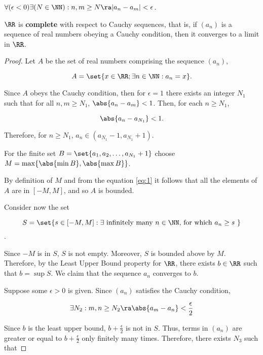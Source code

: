 \documentclass[11pt]{scrartcl}
\begin{document}
\begin{definition}
  $\forall(\epsilon<0)\exists(N\in\NN): n,m \geq N \ra |a_n-a_m|<\epsilon $.
\end{definition}
\begin{theorem}
  $\RR$ is \textbf{complete} with respect to Cauchy sequences, that
  is, if $(a_n)$ is a sequence of real numbers obeying a Cauchy
  condition, then it converges to a limit in $\RR$.
\end{theorem}

\begin{proof}
  Let \(A\) be the set of real numbers comprising the sequence \((a_{n})\),

  \[A = \set{x\in \RR; \exists n\in \NN: a_{n} = x}.   \]

  Since \(A\) obeys the Cauchy condition, then for \(\epsilon = 1\)
  there exists an integer \(N_{1}\) such that for all
  \(n,m\geq N_{1}\), \(\abs{a_{n}-a_{m}}<1\). Then, for each \(n\geq N_{1}\),
  
  \begin{equation}
    \label{eq:1}
    \abs{a_{n}-  a_{N_{1}}}<1.
  \end{equation}
 
  Therefore, for \(n\geq N_{1}\), \(a_{n}\in(a_{N_{1}}-1, a_{N_{1}}+1)\).\vv

  For the finite set \(B=\set{a_{1},a_{2},\dots,a_{N_{1}}+1}\) choose
  \(M=\max\{\abs{\min B}, \abs{\max B}\}\).\vv

  By definition of \(M\) and from the equation \ref{eq:1} it follows
  that all the elements of \(A\) are in \([-M,M]\), and so \(A\) is
  bounded.

  Consider now the set

  \[S = \set{s\in [-M, M]: \exists{\text{\ infinitely many
          \(n\in\NN\), for which \(a_{n} \geq s \)\ }}}\].

  Since \(-M\) is in \(S\), \(S\) is not empty. Moreover, \(S\) is
  bounded above by \(M\). Therefore, by the Least Upper Bound property
  for \(\RR\), there exists \(b\in\RR\) such that \(b=\sup S\). We
  claim that the sequence \(a_{n}\) converges to \(b\).\vv

  Suppose some \(\epsilon>0\) is given. Since \((a_{n})\) satisfies
  the Cauchy condition,

  \[\exists N_{2}: m,n \geq N_{2} \ra \abs{a_{m}-a_{n}}<\frac{\epsilon}{2}\]

  Since \(b\) is the least upper bound, \(b+\frac{\epsilon}{2}\) is
  not in \(S\). Thus, terms in \((a_{n})\) are greater or equal to
  \(b+\frac{\epsilon}{2}\) only finitely many times. Therefore, there
  exists \(N_{3}\) such that


\end{proof}
\end{document}
